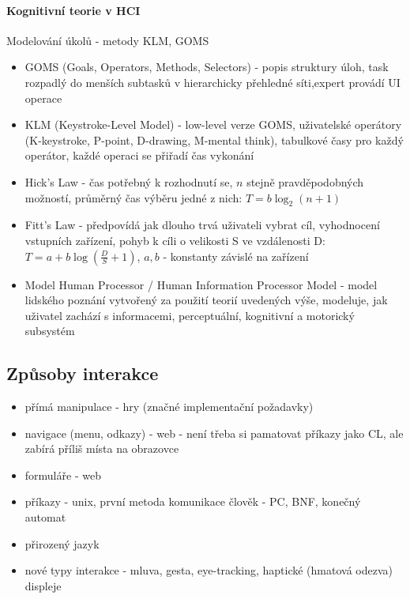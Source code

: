 \paragraph{Kognitivní teorie v HCI}
Modelování úkolů - metody KLM, GOMS
\begin{itemize}[itemsep=0px]
\item GOMS (Goals, Operators, Methods, Selectors) - popis struktury úloh, task rozpadlý do menších subtasků v hierarchicky přehledné síti,expert provádí UI operace
\item KLM (Keystroke-Level Model) - low-level verze GOMS, uživatelské operátory (K-keystroke, P-point, D-drawing, M-mental think), tabulkové časy pro každý operátor, každé operaci se přiřadí čas vykonání
\item Hick's Law - čas potřebný k rozhodnutí se, $n$ stejně pravděpodobných možností, průměrný čas výběru jedné z nich: $T = b \log_2(n + 1)$
\item Fitt's Law - předpovídá jak dlouho trvá uživateli vybrat cíl, vyhodnocení vstupních zařízení, pohyb k cíli o velikosti S ve vzdálenosti D: $T = a + b \log (\frac{D}{S} + 1)$, $a, b$ - konstanty závislé na zařízení
\item Model Human Processor / Human Information Processor Model - model lidského poznání vytvořený za použití teorií uvedených výše, modeluje, jak uživatel zachází s informacemi, perceptuální, kognitivní a motorický subsystém
\end{itemize}

\subsection{Způsoby interakce}
\begin{itemize}[itemsep=0px]
\item přímá manipulace - hry (značné implementační požadavky)
\item navigace (menu, odkazy) - web - není třeba si pamatovat příkazy jako CL, ale zabírá příliš místa na obrazovce
\item formuláře - web
\item příkazy - unix, první metoda komunikace člověk - PC, BNF, konečný automat
\item přirozený jazyk
\item nové typy interakce - mluva, gesta, eye-tracking, haptické (hmatová odezva) displeje
\end{itemize}

